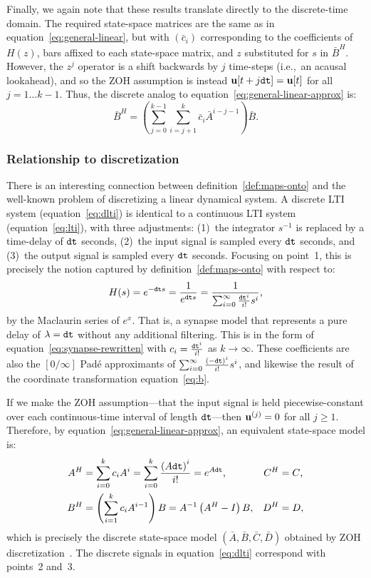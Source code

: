 Finally, we again note that these results translate directly to the discrete-time domain.
The required state-space matrices are the same as in equation~\ref{eq:general-linear}, but with $\left( \bar{c}_i \right)$ corresponding to the coefficients of $H(z)$, bars affixed to each state-space matrix, and $z$ substituted for $s$ in $\bar{B}^H$.
However, the $z^j$ operator is a shift backwards by $j$ time-steps (i.e.,~an acausal lookahead), and so the ZOH assumption is instead $\mathbf{u}[t+j\texttt{dt}{}] = \mathbf{u}[t]$ for all $j = 1 \ldots k - 1$.
Thus, the discrete analog to equation~\ref{eq:general-linear-approx} is:
\begin{equation} \label{eq:general-linear-approx-discrete}
\bar{B}^H = \left( \sum_{j=0}^{k-1} \sum_{i=j+1}^k \bar{c}_i \bar{A}^{i-j-1} \right) \bar{B} \text{.}
\end{equation}

\subsubsection{Relationship to discretization}

There is an interesting connection between definition~\ref{def:maps-onto} and the well-known problem of discretizing a linear dynamical system.
A discrete LTI system (equation~\ref{eq:dlti}) is identical to a continuous LTI system (equation~\ref{eq:lti}), with three adjustments: (1)~the integrator $s^{-1}$ is replaced by a time-delay of $\texttt{dt}{}$ seconds, (2)~the input signal is sampled every $\texttt{dt}{}$ seconds, and (3)~the output signal is sampled every $\texttt{dt}{}$ seconds.
Focusing on point~1, this is precisely the notion captured by definition~\ref{def:maps-onto} with respect to:
\begin{equation*}
H(s) = e^{-\texttt{dt}{}s} = \frac{1}{e^{\texttt{dt}{}s}} = \frac{1}{\sum_{i=0}^\infty \frac{\texttt{dt}{}^i}{i!} s^i} \text{,}
\end{equation*}
by the Maclaurin series of $e^{x}$.
That is, a synapse model that represents a pure delay of $\lambda = \texttt{dt}{}$ without any additional filtering.
This is in the form of equation~\ref{eq:synapse-rewritten} with $c_i = \frac{\texttt{dt}{}^i}{i!}$ as $k \rightarrow \infty$.
These coefficients are also the $\left[ 0 / \infty \right]$ Pad\'e approximants of $\sum_{i=0}^\infty \frac{(-\texttt{dt}{})^i}{i!} s^i$, and likewise the result of the coordinate transformation equation~\ref{eq:b}.

If we make the ZOH assumption---that the input signal is held piecewise-constant over each continuous-time interval of length $\texttt{dt}{}$---then $\mathbf{u}^{(j)} = 0$ for all $j \ge 1$.
Therefore, by equation~\ref{eq:general-linear-approx}, an equivalent state-space model is:
\begin{align*}
A^H &= \sum_{i=0}^k c_i A^i = \sum_{i=0}^k \frac{\left(A\texttt{dt}{}\right)^i}{i!} = e^{A\texttt{dt}{}} \text{,} & C^H &= C \text{,} \\
B^H &= \left( \sum_{i=1}^k c_i A^{i-1} \right) B = A^{-1} \left(A^H - I\right) B \text{,} & D^H &= D \text{,}
\end{align*}
which is precisely the discrete state-space model $(\bar{A}, \bar{B}, \bar{C}, \bar{D})$ obtained by ZOH discretization~\citep{brogan1982modern}.
The discrete signals in equation~\ref{eq:dlti} correspond with points~2 and~3.

